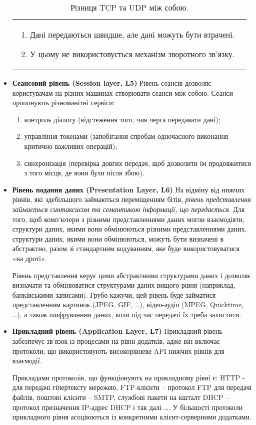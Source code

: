 \begin{itemize}
\begin{table}[ht]
\begin{tabularx}{\textwidth}{X|X}
\begin{enumerate}
                \item Дані передаються швидше, але дані можуть бути втрачені.
                \item У цьому не використовується механізм зворотного зв'язку.
            \end{enumerate} \\
    \end{tabularx}
        \caption{Різниця TCP та UDP між собою.}
    \end{table}
    \item \textbf{Сеансовий рівень (Session layer, L5)}
    Рівень сеансів дозволяє користувачам на різних машинах створювати сеанси між собою. Сеанси пропонують різноманітні сервіси:
    \begin{enumerate}
        \item контроль діалогу (відстеження того, чия черга передавати дані);
        \item управління токенами (запобігання спробам одночасного виконання критично важливих операцій);
        \item синхронізація (перевірка довгих передач, щоб дозволити їм продовжитися з того місця, де вони були після збою).
    \end{enumerate}
    \item \textbf{Рівень подання даних (Presentation Layer, L6)}
    На відміну від нижчих рівнів, які здебільшого займаються переміщенням бітів, \textit{рівень представлення займається синтаксисом та семантикою інформації, що передається}. Для того, щоб комп'ютери з різними представленнями даних могли взаємодіяти, структури даних, якими вони обмінюються різними представленнями даних, структури даних, якими вони обмінюються, можуть бути визначені в абстрактно, разом зі стандартним кодуванням, яке буде використовуватися «на дроті».
    
    Рівень представлення керує цими абстрактними структурами даних і дозволяє визначати та обмінюватися структурами даних вищого рівня (наприклад, банківськими записами).
    Грубо кажучи, цей рівень буде займатися представленням картинок (JPEG, GIF, \dots), відео-аудіо (MPEG, Quicktime, \dots), а також шифруванням даних, коли під час передачі їх треба захистити.
    
    \item \textbf{Прикладний рівень (Application Layer, L7)}
    Прикладний рівень забезпечує зв'язок із процесами на рівні додатків, адже він включає протоколи, що використовують високорівневе API нижчих рівнів для взаємодії.
    
    Прикладами протоколів, що функціонують на прикладному рівні є: HTTP - для передачі гіпертексту мережею, FTP-клієнти -- протокол FTP для передачі файлів, поштові клієнти -- SMTP, службові пакети на кшталт DHCP -- протокол призначення IP-адрес DHCP і так далі \dots. У більшості протоколи прикладного рівня асоціюються із конкретними клієнт-серверними додатками.    
\end{itemize}
